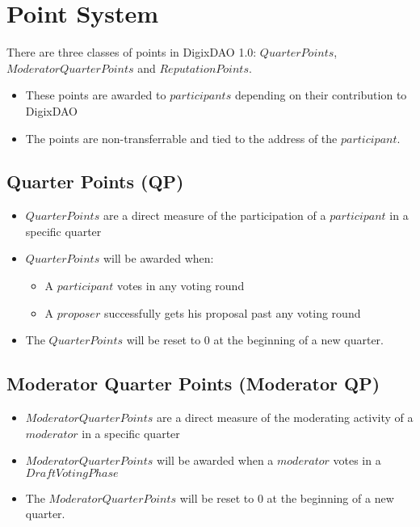 \documentclass[11pt,a4paper,titlepage]{article}
\begin{document}
\section{Point System}{
	There are three classes of points in DigixDAO 1.0: $Quarter Points$, $Moderator Quarter Points$ and $Reputation Points$. \begin{itemize}
		\item These points are awarded to $participants$ depending on their contribution to DigixDAO
		\item The points are non-transferrable and tied to the address of the $participant$.
	\end{itemize} 
	\subsection{Quarter Points (QP)}{
		\begin{itemize}
			\item $Quarter Points$ are a direct measure of the participation of a $participant$ in a specific quarter
			\item $Quarter Points$ will be awarded when:
			\begin{itemize}
				\item A $participant$ votes in any voting round
				\item A $proposer$ successfully gets his proposal past any voting round
			\end{itemize}
			\item The $Quarter Points$ will be reset to 0 at the beginning of a new quarter.
		\end{itemize}
	}
	\subsection{Moderator Quarter Points (Moderator QP)}{
		\begin{itemize}
			\item $Moderator Quarter Points$ are a direct measure of the moderating activity of a $moderator$ in a specific quarter
			\item $Moderator Quarter Points$ will be awarded when a $moderator$ votes in a $Draft Voting Phase$
			\item The $Moderator Quarter Points$ will be reset to 0 at the beginning of a new quarter.
		\end{itemize}
	}
}
\end{document}
